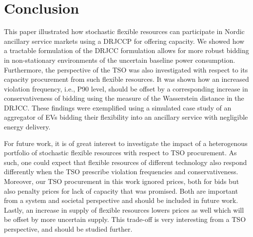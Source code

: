 \documentclass[conference]{IEEEtran}
\begin{document}
\section{Conclusion}

This paper illustrated how stochastic flexible resources can participate in Nordic ancillary service markets using a \ac{DRJCCP} for offering capacity. We showed how a tractable formulation of the \ac{DRJCC} formulation allows for more robust bidding in non-stationary environments of the uncertain baseline power consumption. Furthermore, the perspective of the \ac{TSO} was also investigated with respect to its capacity procurement from such flexible resources. It was shown how an increased violation frequency, i.e., P90 level, should be offset by a corresponding increase in conservativeness of bidding using the measure of the Wasserstein distance in the \ac{DRJCC}. These findings were exemplified using a simulated case study of an aggregator of \acp{EV} bidding their flexibility into an ancillary service with negligible energy delivery.

For future work, it is of great interest to investigate the impact of a heterogenous portfolio of stochastic flexible resources with respect to \ac{TSO} procurement. As such, one could expect that flexible resources of different technology also respond differently when the \ac{TSO} prescribe violation frequencies and conservativeness. Moreover, our \ac{TSO} procurement in this work ignored prices, both for bids but also penalty prices for lack of capacity that was promised. Both are important from a system and societal perspective and should be included in future work. Lastly, an increase in supply of flexible resources lowers prices as well which will be offset by more uncertain supply. This trade-off is very interesting from a \ac{TSO} perspective, and should be studied further.







%


\vfill
\end{document}
